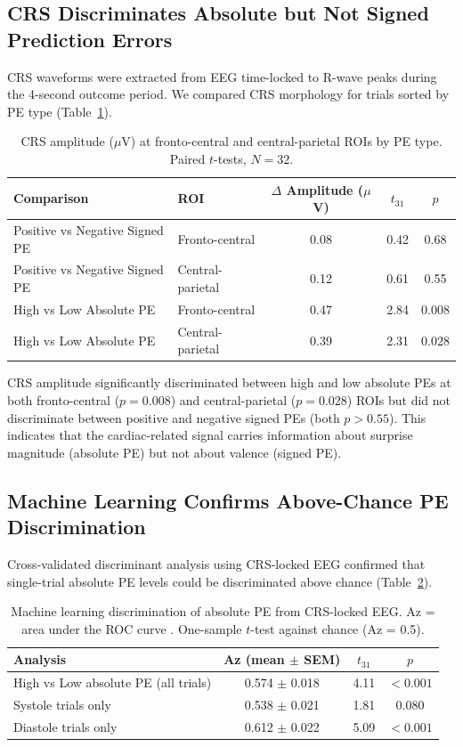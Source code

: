 \documentclass[11pt]{article}
\begin{document}
\subsection{CRS Discriminates Absolute but Not Signed Prediction Errors}

CRS waveforms were extracted from EEG time-locked to R-wave peaks during the 4-second outcome period. We compared CRS morphology for trials sorted by PE type (Table~\ref{tab:crs_pe}).

\begin{table}[H]
\centering
\caption{CRS amplitude ($\mu$V) at fronto-central and central-parietal ROIs by PE type. Paired $t$-tests, $N = 32$.}
\label{tab:crs_pe}
\begin{tabular}{llccc}
\toprule
Comparison & ROI & $\Delta$ Amplitude ($\mu$V) & $t_{31}$ & $p$ \\
\midrule
Positive vs Negative Signed PE & Fronto-central & 0.08 & 0.42 & 0.68 \\
Positive vs Negative Signed PE & Central-parietal & 0.12 & 0.61 & 0.55 \\
High vs Low Absolute PE & Fronto-central & 0.47 & 2.84 & $\mathbf{0.008}$ \\
High vs Low Absolute PE & Central-parietal & 0.39 & 2.31 & $\mathbf{0.028}$ \\
\bottomrule
\end{tabular}
\end{table}

CRS amplitude significantly discriminated between high and low absolute PEs at both fronto-central ($p = 0.008$) and central-parietal ($p = 0.028$) ROIs but did not discriminate between positive and negative signed PEs (both $p > 0.55$). This indicates that the cardiac-related signal carries information about surprise magnitude (absolute PE) but not about valence (signed PE).

\subsection{Machine Learning Confirms Above-Chance PE Discrimination}

Cross-validated discriminant analysis \citep{discriminant_analysis2009} using CRS-locked EEG confirmed that single-trial absolute PE levels could be discriminated above chance (Table~\ref{tab:ml}).

\begin{table}[H]
\centering
\caption{Machine learning discrimination of absolute PE from CRS-locked EEG. Az = area under the ROC curve \citep{az_metric2006}. One-sample $t$-test against chance (Az = 0.5).}
\label{tab:ml}
\begin{tabular}{lccc}
\toprule
Analysis & Az (mean $\pm$ SEM) & $t_{31}$ & $p$ \\
\midrule
High vs Low absolute PE (all trials) & 0.574 $\pm$ 0.018 & 4.11 & $\mathbf{< 0.001}$ \\
Systole trials only & 0.538 $\pm$ 0.021 & 1.81 & 0.080 \\
Diastole trials only & 0.612 $\pm$ 0.022 & 5.09 & $\mathbf{< 0.001}$ \\
\bottomrule
\end{tabular}
\end{table}
\end{document}

